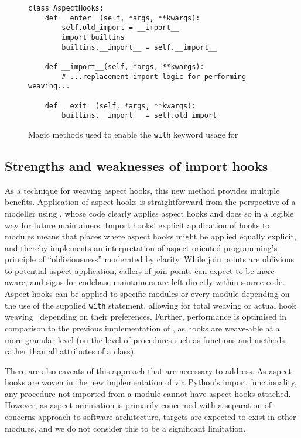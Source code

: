 \begin{figure}[t]
\begin{lstlisting}
class AspectHooks:
    def __enter__(self, *args, **kwargs):
        self.old_import = __import__
        import builtins
        builtins.__import__ = self.__import__

    def __import__(self, *args, **kwargs):
        # ...replacement import logic for performing weaving...

    def __exit__(self, *args, **kwargs):
        builtins.__import__ = self.old_import
\end{lstlisting}
    
    \caption{Magic methods used to enable the \lstinline{with} keyword usage for
    \pdsf{}}
    \label{fig:aspecthooksmagicmethodswith}
\end{figure}

\subsection{Strengths and weaknesses of import hooks}\label{subsec:pdsf3importhooklimitations}

As a technique for weaving aspect hooks, this new method provides multiple
benefits. Application of aspect hooks is straightforward from the perspective of
a modeller using \pdsf{}, whose code clearly applies aspect hooks and does so
in a legible way for future maintainers. Import hooks' explicit application of hooks to modules
means that places where aspect hooks might be applied equally explicit, and thereby implements an
interpretation of aspect-oriented programming's principle of ``obliviousness'' moderated by clarity.
While join points are oblivious to potential aspect application, callers of join points can expect
to be more aware, and signs for codebase maintainers are left directly within source code.
Aspect hooks can be applied to specific modules
or every module depending on the use of the supplied \lstinline{with} statement,
allowing for total weaving or actual hook weaving~\cite{dynamicAOchitchyan}
depending on their preferences. Further, performance is optimised in
comparison to the previous implementation of \pdsf{}, as hooks are weave-able
at a more granular level (on the level of procedures such as functions and
methods, rather than all attributes of a class).

There are also caveats of this approach that are necessary to address.
As aspect hooks are woven in the new implementation of \pdsf{} via Python's
import functionality, any procedure not imported from a module cannot have
aspect hooks attached. However, as
aspect orientation is primarily concerned with a separation-of-concerns approach
to software architecture, targets are expected to exist in other modules, and we
do not consider this to be a significant limitation.

